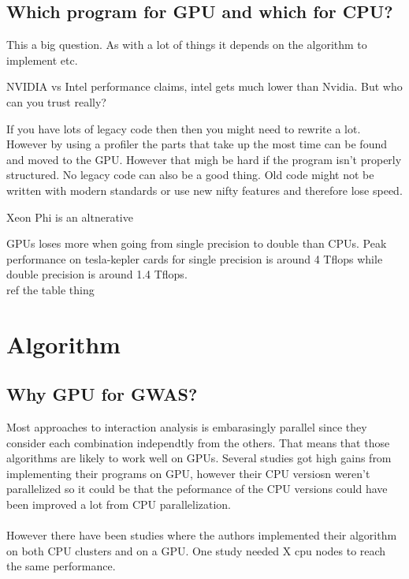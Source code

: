\documentclass[10pt,a4paper]{article}
\begin{document}
\subsection{Which program for GPU and which for CPU?}
This a big question. As with a lot of things it depends on the algorithm to implement etc.

NVIDIA vs Intel performance claims, intel gets much lower than Nvidia. But who can you trust really?

If you have lots of legacy code then then you might need to rewrite a lot. However by using a profiler the parts that take up the most time can be found and moved to the GPU. However that migh be hard if the program isn't properly structured. No legacy code can also be a good thing. Old code might not be written with modern standards or use new nifty features and therefore lose speed.

Xeon Phi is an altnerative

GPUs loses more when going from single precision to double than CPUs. Peak performance on tesla-kepler cards for single precision is around 4 Tflops while double precision is around 1.4 Tflops. \cite{nvtesla}\\ ref the table thing

\section{Algorithm}


\subsection{Why GPU for GWAS?}
Most approaches to interaction analysis is embarasingly parallel since they consider each combination independtly from the others. That means that those algorithms are likely to work well on GPUs. Several studies got high gains from implementing their programs on GPU, however their CPU versiosn weren't parallelized so it could be that the peformance of the CPU versions could have been improved a lot from CPU parallelization.\cite{gwis,gboost,gmdr_gpu,cuda_lr,genie_2012,plink_gpu}\\
\\
However there have been studies where the authors implemented their algorithm on both CPU clusters and on a GPU. One study needed X cpu nodes to reach the same performance. %
\end{document}

